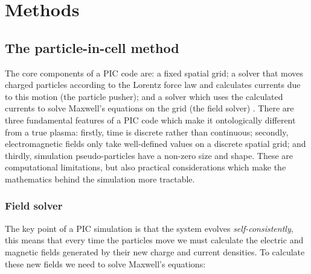 \chapter{Methods}
\label{chp:methods}
 


\section{The particle-in-cell method}
The core components of a PIC code are: a fixed spatial grid; a solver that moves charged particles according to the Lorentz force law and calculates currents due to this motion (the particle pusher); and a solver which uses the calculated currents to solve Maxwell's equations on the grid (the field solver) \citep{Arber2015}. There are three fundamental features of a PIC code which make it ontologically different from a true plasma: firstly, time is discrete rather than continuous; secondly, electromagnetic fields only take well-defined values on a discrete spatial grid; and thirdly, simulation pseudo-particles have a non-zero size and shape. These are computational limitations, but also practical considerations which make the mathematics behind the simulation more tractable.


\subsection{Field solver}
The key point of a PIC simulation is that the system evolves \emph{self-consistently}, this means that every time the particles move we must calculate the electric and magnetic fields generated by their new charge and current densities. To calculate these new fields we need to solve Maxwell's equations:

